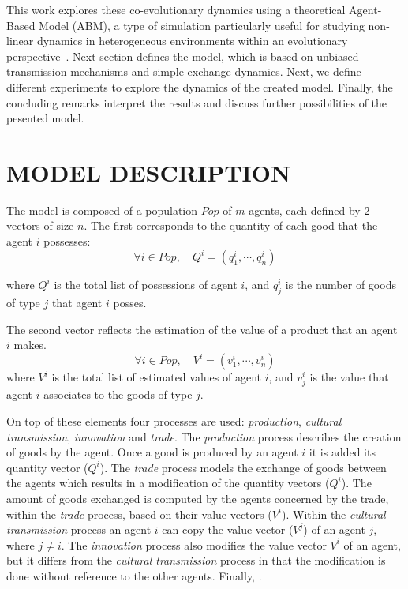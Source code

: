 \documentclass{wscpaperproc}
\begin{document}
This work explores these co-evolutionary dynamics using a theoretical Agent-Based Model (ABM), a type of simulation particularly useful for studying non-linear dynamics in heterogeneous environments within an evolutionary perspective~\cite{lake_trends_2014}. Next section defines the model, which is based on unbiased transmission mechanisms and simple exchange dynamics. Next, we define different experiments to explore the dynamics of the created model. Finally, the concluding remarks interpret the results and discuss further possibilities of the pesented model.

\section{MODEL DESCRIPTION}

The model is composed of a population $Pop$ of $m$ agents, each defined by 2 vectors of size $n$. The first corresponds to the quantity of each good that the agent $i$ possesses: 
$$\forall i \in Pop, \quad Q^i = (q^i_1,\cdots,q^i_n) $$

where $Q^i$ is the total list of possessions of agent $i$, and $q^i_j$ is the number of goods of type $j$ that agent $i$ posses.

The second vector reflects the estimation of the value of a product that an agent $i$ makes.
$$\forall i \in Pop, \quad V^i = (v^i_1,\cdots,v^i_n) $$
where $V^i$ is the total list of estimated values of agent $i$, and $v^i_j$ is the value that agent $i$ associates to the goods of type $j$.

On top of these elements four processes are used: \emph{production}, \emph{cultural transmission}, \emph{innovation} and \emph{trade}. The \textit{production} process describes the creation of goods by the agent. Once a good is produced by an agent $i$ it is added its quantity vector ($Q^i$). The \emph{trade} process models the exchange of goods between the agents which results in a modification of the quantity vectors ($Q^i$). The amount of goods exchanged is computed by the agents concerned by the trade, within the \emph{trade} process, based on their value vectors ($V^i$). Within the \textit{cultural transmission} process an agent $i$ can copy the value vector ($V^j$) of an agent $j$, where $j \neq i$. The \textit{innovation} process also modifies the value vector $V^i$ of an agent, but it differs from the \emph{cultural transmission} process in that the modification is done without reference to the other agents. Finally, .
\end{document}

